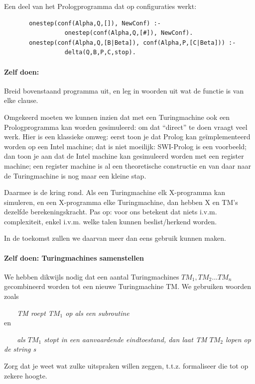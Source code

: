 Een deel van het Prologprogramma dat op configuraties werkt:

\begin{verbatim}
       onestep(conf(Alpha,Q,[]), NewConf) :-
                 onestep(conf(Alpha,Q,[#]), NewConf).
       onestep(conf(Alpha,Q,[B|Beta]), conf(Alpha,P,[C|Beta])) :-
                 delta(Q,B,P,C,stop).
\end{verbatim}

\paragraph{Zelf doen:} Breid bovenstaand programma uit,
en leg in woorden uit wat de functie is van elke clause.


Omgekeerd moeten we kunnen inzien dat met een Turingmachine ook een
Prologprogramma kan worden gesimuleerd: om dat ``direct'' te doen
vraagt veel werk. Hier is een klassieke omweg: eerst toon je dat
Prolog kan ge\"{i}mplementeerd worden op een Intel machine; dat is niet
moeilijk: SWI-Prolog is een voorbeeld; dan toon je aan dat de Intel
machine kan gesimuleerd worden met een register machine; een register
machine is al een theoretische constructie en van daar naar de
Turingmachine is nog maar een kleine stap.


Daarmee is de kring rond. Als een Turingmachine elk X-programma
kan simuleren, en een X-programma elke Turingmachine, dan hebben X en
TM's dezelfde berekeningskracht. Pas op: voor ons betekent dat niets
i.v.m. complexiteit, enkel i.v.m. welke talen kunnen beslist/herkend
worden.


In de toekomst zullen we daarvan meer dan eens gebruik kunnen maken.



\paragraph{Zelf doen: Turingmachines samenstellen}

We hebben dikwijls nodig dat een aantal Turingmachines $TM_1, TM_2
... TM_n$ gecombineerd worden tot een nieuwe Turingmachine TM. We
gebruiken woorden zoals

$~~~~~~~$ {\em TM roept T$M_1$ op als een subroutine}\\
en

$~~~~~~~$ {\em als $TM_1$ stopt in een aanvaardende eindtoestand,
dan laat TM $TM_2$ lopen op de string s}


Zorg dat je weet wat zulke uitspraken willen zeggen,
t.t.z. formaliseer die tot op zekere hoogte.



